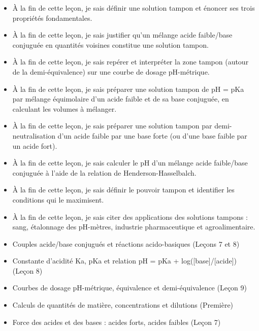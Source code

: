 \documentclass[11pt]{article}
\begin{document}
\begin{objectifs}
\begin{itemize}
\item À la fin de cette leçon, je sais définir une solution tampon et énoncer ses trois propriétés fondamentales.
\item À la fin de cette leçon, je sais justifier qu'un mélange acide faible/base conjuguée en quantités voisines constitue une solution tampon.
\item À la fin de cette leçon, je sais repérer et interpréter la zone tampon (autour de la demi-équivalence) sur une courbe de dosage pH-métrique.
\item À la fin de cette leçon, je sais préparer une solution tampon de pH = pKa par mélange équimolaire d'un acide faible et de sa base conjuguée, en calculant les volumes à mélanger.
\item À la fin de cette leçon, je sais préparer une solution tampon par demi-neutralisation d'un acide faible par une base forte (ou d'une base faible par un acide fort).
\item À la fin de cette leçon, je sais calculer le pH d'un mélange acide faible/base conjuguée à l'aide de la relation de Henderson-Hasselbalch.
\item À la fin de cette leçon, je sais définir le pouvoir tampon et identifier les conditions qui le maximisent.
\item À la fin de cette leçon, je sais citer des applications des solutions tampons : sang, étalonnage des pH-mètres, industrie pharmaceutique et agroalimentaire.
\end{itemize}
\end{objectifs}

\begin{prerequis}
\begin{itemize}
\item Couples acide/base conjugués et réactions acido-basiques (Leçons 7 et 8)
\item Constante d'acidité Ka, pKa et relation pH = pKa + log([base]/[acide]) (Leçon 8)
\item Courbes de dosage pH-métrique, équivalence et demi-équivalence (Leçon 9)
\item Calculs de quantités de matière, concentrations et dilutions (Première)
\item Force des acides et des bases : acides forts, acides faibles (Leçon 7)
\end{itemize}
\end{prerequis}
\end{document}
